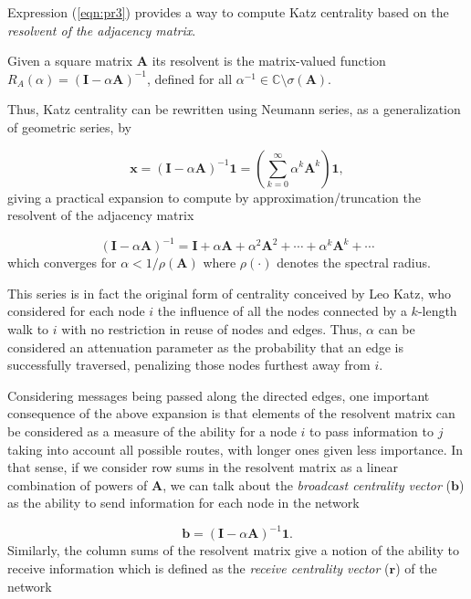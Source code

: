 Expression (\ref{eqn:pr3}) provides a way to compute Katz centrality based on the \textit{resolvent of the adjacency matrix}.

\begin{definition}
    Given a square matrix $\mathbf{A}$ its resolvent is the matrix-valued function $R_A(\alpha) = (\mathbf{I} − \alpha \mathbf{A})^{−1}$, defined for all $\alpha^{-1} \in \mathbb{C}\setminus\sigma(\mathbf{A})$. 
\end{definition}

Thus, Katz centrality can be rewritten using Neumann series, as a generalization of geometric series, by

\begin{equation}
\label{eqn:katz2}
    \mathbf{x}=(\mathbf{I}-\alpha\mathbf{A})^{-1}\mathbf{1}=\left(\sum_{k=0}^{\infty}\alpha^k \mathbf{A}^k\right)\mathbf{1},
\end{equation}
giving a practical expansion to compute by approximation/truncation the resolvent of the adjacency matrix

\begin{equation}
\label{eqn:katz3}
    (\mathbf{I}-\alpha\mathbf{A})^{-1} = \mathbf{I} + \alpha\mathbf{A} + \alpha^2\mathbf{A}^2 + \cdots + \alpha^k\mathbf{A}^k + \cdots
\end{equation}
which converges for $\alpha<1/\rho(\mathbf{A})$ where $\rho(\cdot)$ denotes the spectral radius. 

This series is in fact the original form of centrality conceived by Leo Katz, who considered for each node $i$ the influence of all the nodes connected by a $k$-length walk to $i$ with no restriction in reuse of nodes and edges. Thus, $\alpha$ can be considered an attenuation parameter as the probability that an edge is successfully traversed, penalizing those nodes furthest away from $i$. 

Considering messages being passed along the directed edges, one important consequence of the above expansion is that elements of the resolvent matrix can be considered as a measure of the ability for a node $i$ to pass information to $j$ taking into account all possible routes, with longer ones given less importance. In that sense, if we consider row sums in the resolvent matrix as a linear combination of powers of $\mathbf{A}$, we can talk about the \textit{broadcast centrality vector} ($\mathbf{b}$) as the ability to send information for each node in the network 

\begin{equation}
\label{eqn:broad}
    \mathbf{b}=(\mathbf{I}-\alpha\mathbf{A})^{-1} \mathbf{1}.
\end{equation}
Similarly, the column sums of the resolvent matrix give a notion of the ability to receive information which is defined as the \textit{receive centrality vector} ($\mathbf{r}$) of the network

